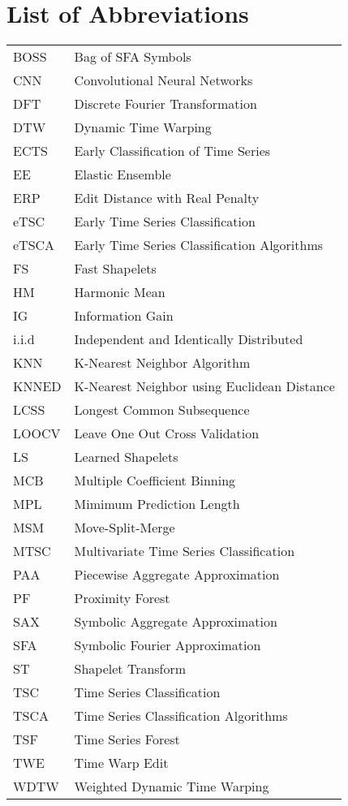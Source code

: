 \section*{List of Abbreviations}


\begin{table}[h!]
\begin{tabular}{ll}
BOSS   & Bag of SFA Symbols\\
CNN   & Convolutional Neural Networks\\
DFT   & Discrete Fourier Transformation\\
DTW   & Dynamic Time Warping\\
ECTS   & Early Classification of Time Series\\
EE   & Elastic Ensemble\\
ERP   & Edit Distance with Real Penalty\\
eTSC   & Early Time Series Classification\\
eTSCA   & Early Time Series Classification Algorithms\\
FS   & Fast Shapelets\\
HM   & Harmonic Mean\\
IG   & Information Gain\\
i.i.d   & Independent and Identically Distributed\\
KNN   & K-Nearest Neighbor Algorithm\\
KNNED   & K-Nearest Neighbor using Euclidean Distance\\
LCSS   & Longest Common Subsequence\\
LOOCV   & Leave One Out Cross Validation\\
LS   & Learned Shapelets\\
MCB   & Multiple Coefficient Binning\\
MPL   & Mimimum Prediction Length\\
MSM   & Move-Split-Merge\\
MTSC   & Multivariate Time Series Classification\\
PAA   & Piecewise Aggregate Approximation\\
PF   & Proximity Forest\\
SAX   & Symbolic Aggregate Approximation\\
SFA   & Symbolic Fourier Approximation\\
ST   & Shapelet Transform\\
TSC   & Time Series Classification\\
TSCA   & Time Series Classification Algorithms\\
TSF   & Time Series Forest\\
TWE   & Time Warp Edit\\
WDTW   & Weighted Dynamic Time Warping
\end{tabular}
\end{table}

\null\newpage

